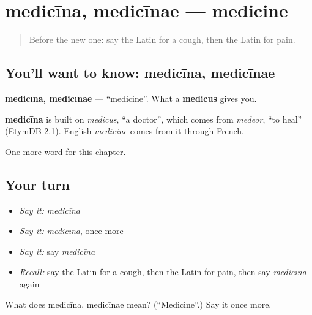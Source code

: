 \section[medicīna, medicīnae]{medicīna, medicīnae — medicine}

\label{lesson:LA-C67-medicina}



\begin{quote}
Before the new one: say the Latin for a cough, then the Latin for pain.
\end{quote}

\subsection*{You'll want to know: medicīna, medicīnae}
\textbf{medicīna, medicīnae} — \textquotedblleft{}medicine\textquotedblright{}. What a \textbf{medicus} gives you.

\begin{cousinweb}
\textbf{medicīna} is built on \emph{medicus}, \textquotedblleft{}a doctor\textquotedblright{}, which comes from \emph{medeor}, \textquotedblleft{}to heal\textquotedblright{} (EtymDB 2.1). English \emph{medicine} comes from it through French.
\end{cousinweb}

\begin{grammarlens}[title={What you've built}]
One more word for this chapter.
\end{grammarlens}

\subsection*{Your turn}
\begin{itemize}
\raggedright
  \item \emph{Say it:} \emph{medicīna}
  \item \emph{Say it:} \emph{medicīna}, once more
  \item \emph{Say it:} say \emph{medicīna}
  \item \emph{Recall:} say the Latin for a cough, then the Latin for pain, then say \emph{medicīna} again
\end{itemize}

\begin{tcolorbox}[breakable,colback=teal!4,colframe=teal!35!black,title={Before you move on}]
What does medicīna, medicīnae mean? (\textquotedblleft{}Medicine\textquotedblright{}.) Say it once more.
\end{tcolorbox}
